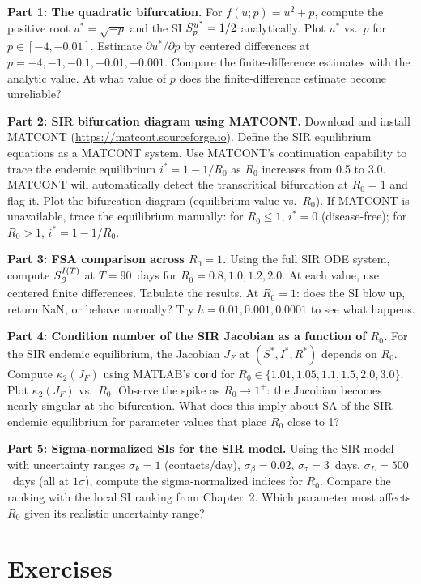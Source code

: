 \textbf{Part 1: The quadratic bifurcation.}
For $f(u;p) = u^2 + p$, compute the positive root $u^* = \sqrt{-p}$
and the SI $S_{p}^{u^*} = 1/2$ analytically.
Plot $u^*$ vs.\ $p$ for $p \in [-4, -0.01]$.
Estimate $\partial u^*/\partial p$ by centered differences at
$p = -4, -1, -0.1, -0.01, -0.001$.
Compare the finite-difference estimates with the analytic value.
At what value of $p$ does the finite-difference estimate become unreliable?

\textbf{Part 2: SIR bifurcation diagram using MATCONT.}
Download and install MATCONT (\url{https://matcont.sourceforge.io}).
Define the SIR equilibrium equations as a MATCONT system.
Use MATCONT's continuation capability to trace the endemic equilibrium
$i^* = 1 - 1/R_0$ as $R_0$ increases from 0.5 to 3.0.
MATCONT will automatically detect the transcritical bifurcation at $R_0 = 1$
and flag it. Plot the bifurcation diagram (equilibrium value vs.\ $R_0$).
If MATCONT is unavailable, trace the equilibrium manually:
for $R_0 \leq 1$, $i^* = 0$ (disease-free); for $R_0 > 1$, $i^* = 1 - 1/R_0$.

\textbf{Part 3: FSA comparison across $R_0 = 1$.}
Using the full SIR ODE system, compute $S_{\beta}^{I(T)}$ at
$T = 90$~days for $R_0 = 0.8, 1.0, 1.2, 2.0$.
At each value, use centered finite differences.
Tabulate the results. At $R_0 = 1$: does the SI blow up, return NaN,
or behave normally? Try $h = 0.01, 0.001, 0.0001$ to see what happens.

\textbf{Part 4: Condition number of the SIR Jacobian as a function of $R_0$.}
For the SIR endemic equilibrium, the Jacobian $J_F$ at $(S^*, I^*, R^*)$
depends on $R_0$. Compute $\kappa_2(J_F)$ using MATLAB's \texttt{cond}
for $R_0 \in \{1.01, 1.05, 1.1, 1.5, 2.0, 3.0\}$.
Plot $\kappa_2(J_F)$ vs.\ $R_0$.
Observe the spike as $R_0 \to 1^+$: the Jacobian becomes nearly singular
at the bifurcation. What does this imply about SA of the SIR endemic equilibrium
for parameter values that place $R_0$ close to 1?

\textbf{Part 5: Sigma-normalized SIs for the SIR model.}
Using the SIR model with uncertainty ranges $\sigma_k = 1$
(contacts/day), $\sigma_\beta = 0.02$, $\sigma_\tau = 3$~days,
$\sigma_L = 500$~days (all at $1\sigma$), compute the sigma-normalized
indices for $R_0$. Compare the ranking with the local SI ranking
from Chapter~2. Which parameter most affects $R_0$ given its
realistic uncertainty range?

\section{Exercises}


